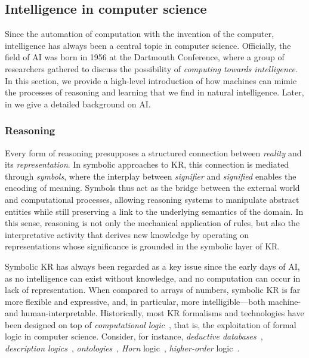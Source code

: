 \subsection{Intelligence in computer science}
\label{subsec:intelligence-in-computer-science}
%
Since the automation of computation with the invention of the computer, intelligence has always been a central topic in computer science.
%
Officially, the field of \gls{AI} was born in 1956 at the Dartmouth Conference, where a group of researchers gathered to discuss the possibility of \emph{computing towards intelligence}.
%
In this section, we provide a high-level introduction of how machines can mimic the processes of reasoning and learning that we find in natural intelligence.
%
Later, in  we give a detailed background on \gls{AI}.


\subsubsection{Reasoning}\label{subsubsec:reasoning-cs}
%
Every form of reasoning presupposes a structured connection between \emph{reality} and its \emph{representation}.
%
In symbolic approaches to \gls{KR}, this connection is mediated through \emph{symbols}, where the interplay between \emph{signifier} and \emph{signified} enables the encoding of meaning.
%
Symbols thus act as the bridge between the external world and computational processes, allowing reasoning systems to manipulate abstract entities while still preserving a link to the underlying semantics of the domain.
%
In this sense, reasoning is not only the mechanical application of rules, but also the interpretative activity that derives new knowledge by operating on representations whose significance is grounded in the symbolic layer of \gls{KR}.


Symbolic \gls{KR} has always been regarded as a key issue since the early days of \gls{AI}, as no intelligence can exist without knowledge, and no computation can occur in lack of representation.
%
When compared to arrays of numbers, symbolic \gls{KR} is far more flexible and expressive, and, in particular, more intelligible---both machine- and human-interpretable.
%
Historically, most \gls{KR} formalisms and technologies have been designed on top of \emph{computational logic}~\cite{lloyd1990computational}, that is, the exploitation of formal logic in computer science.
%
Consider, for instance, \emph{deductive databases}~\cite{green1968}, \emph{description logics}~\cite{DBLP:conf/dlog/2003handbook}, \emph{ontologies}~\cite{cimiano2006-ontologies}, \emph{Horn} logic~\cite{Mcnulty1977}, \emph{higher-order} logic~\cite{VanBenthem2001}.


